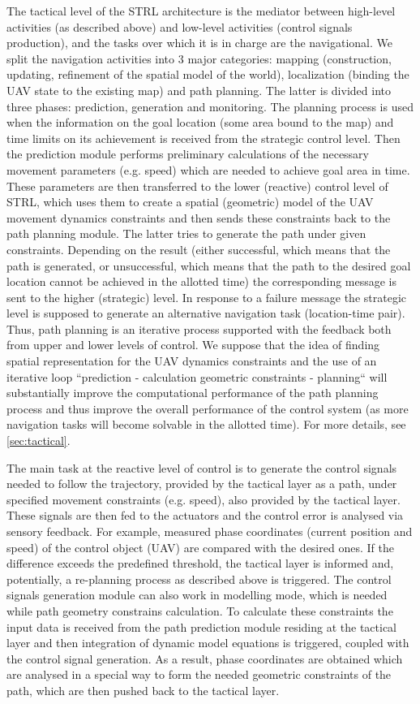 \documentclass[review]{elsarticle}
\begin{document}
The tactical level of the STRL architecture is the mediator between high-level activities (as described above) and low-level activities (control signals production), and the tasks over which it is in charge are the navigational. We split the navigation activities into 3 major categories: mapping (construction, updating, refinement of the spatial model of the world), localization (binding the UAV state to the existing map) and path planning. The latter is divided into three phases: prediction, generation and monitoring. The planning process is used when the information on the goal location (some area bound to the map) and time limits on its achievement is received from the strategic control level. Then the prediction module performs preliminary calculations of the necessary movement parameters (e.g. speed) which are needed to achieve goal area in time. These parameters are then transferred to the lower (reactive) control level of STRL, which uses them to create a spatial (geometric) model of the UAV movement dynamics constraints and then sends these constraints back to the path planning module. The latter tries to generate the path under given constraints. Depending on the result (either successful, which means that the path is generated, or unsuccessful, which means that the path to the desired goal location cannot be achieved in the allotted time) the corresponding message is sent to the higher (strategic) level. In response to a failure message the strategic level is supposed to generate an alternative navigation task (location-time pair). Thus, path planning is an iterative process supported with the feedback both from upper and lower levels of control. We suppose that the idea of finding spatial representation for the UAV dynamics constraints and the use of an iterative loop ``prediction - calculation geometric constraints - planning`` will substantially improve the computational performance of the path planning process and thus improve the overall performance of the control system (as more navigation tasks will become solvable in the allotted time). For more details, see \autoref{sec:tactical}.

The main task at the reactive level of control is to generate the control signals needed to follow the trajectory, provided by the tactical layer as a path, under specified movement constraints (e.g. speed), also provided by the tactical layer. These signals are then fed to the actuators and the control error is analysed via sensory feedback. For example, measured phase coordinates (current position and speed) of the control object (UAV) are compared with the desired ones. If the difference exceeds the predefined threshold, the tactical layer is informed and, potentially, a re-planning process as described above is triggered. The control signals generation module can also work in modelling mode, which is needed while path geometry constrains calculation. To calculate these constraints the input data is received from the path prediction module residing at the tactical layer and then integration of dynamic model equations is triggered, coupled with the control signal generation. As a result, phase coordinates are obtained which are analysed in a special way to form the needed geometric constraints of the path, which are then pushed back to the tactical layer.
\end{document}
